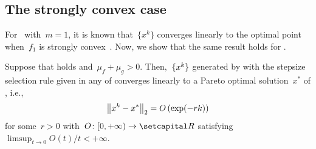 \documentclass[../../main]{subfiles}
\begin{document}
\subsection{The strongly convex case}
For~ with~$m = 1$, it is known that~$\{x^k\}$ converges linearly to the optimal point when~$f_1$ is strongly convex~\cite{Beck2017}.
Now, we show that the same result holds for .
\begin{theorem} 
    Suppose that  holds and~$\mu_f + \mu_g > 0$.
    Then,~$\set{x^k}$ generated by  with the stepsize selection rule given in any of  converges linearly to a Pareto optimal solution~$x^*$ of , i.e.,
    \begin{equation}
        \norm*{x^k - x^*}_2 = O\left(\exp(-rk)\right) 
    \end{equation}
    for some~$r > 0$ with~$O \colon [0, + \infty) \to \setR$ satisfying~$\limsup_{t \to 0} O(t) / t < + \infty$.
\end{theorem}
\end{document}

